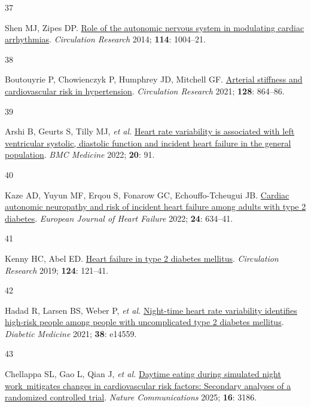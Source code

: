 \documentclass[
  a4paper,
  headsepline=true,
  open=any]{scrbook}
\newlength{\cslhangindent}
\newlength{\csllabelwidth}
\newlength{\cslentryspacingunit} %
\newenvironment{CSLReferences}[2] %
 {%
  \setlength{\parindent}{0pt}
  \ifodd #1
  \let\oldpar\par
  \def\par{\hangindent=\cslhangindent\oldpar}
  \fi
  \setlength{\parskip}{#2\cslentryspacingunit}
 }%
 {}
\newcommand{\CSLLeftMargin}[1]{\parbox[t]{\csllabelwidth}{#1}}
\newcommand{\CSLRightInline}[1]{\parbox[t]{\linewidth - \csllabelwidth}{#1}\break}
\begin{document}
\begin{CSLReferences}{0}{0}
\leavevmode{}%
\CSLLeftMargin{37 }%
\CSLRightInline{Shen MJ, Zipes DP.
\href{https://doi.org/10.1161/CIRCRESAHA.113.302549}{Role of the
autonomic nervous system in modulating cardiac arrhythmias}.
\emph{Circulation Research} 2014; \textbf{114}: 1004--21.}

\leavevmode{}%
\CSLLeftMargin{38 }%
\CSLRightInline{Boutouyrie P, Chowienczyk P, Humphrey JD, Mitchell GF.
\href{https://doi.org/10.1161/CIRCRESAHA.121.318061}{Arterial stiffness
and cardiovascular risk in hypertension}. \emph{Circulation Research}
2021; \textbf{128}: 864--86.}

\leavevmode{}%
\CSLLeftMargin{39 }%
\CSLRightInline{Arshi B, Geurts S, Tilly MJ, \emph{et al.}
\href{https://doi.org/10.1186/s12916-022-02273-9}{Heart rate variability
is associated with left ventricular systolic, diastolic function and
incident heart failure in the general population}. \emph{BMC Medicine}
2022; \textbf{20}: 91.}

\leavevmode{}%
\CSLLeftMargin{40 }%
\CSLRightInline{Kaze AD, Yuyun MF, Erqou S, Fonarow GC,
Echouffo-Tcheugui JB. \href{https://doi.org/10.1002/ejhf.2432}{Cardiac
autonomic neuropathy and risk of incident heart failure among adults
with type 2 diabetes}. \emph{European Journal of Heart Failure} 2022;
\textbf{24}: 634--41.}

\leavevmode{}%
\CSLLeftMargin{41 }%
\CSLRightInline{Kenny HC, Abel ED.
\href{https://doi.org/10.1161/CIRCRESAHA.118.311371}{Heart failure in
type 2 diabetes mellitus}. \emph{Circulation Research} 2019;
\textbf{124}: 121--41.}

\leavevmode{}%
\CSLLeftMargin{42 }%
\CSLRightInline{Hadad R, Larsen BS, Weber P, \emph{et al.}
\href{https://doi.org/10.1111/dme.14559}{Night-time heart rate
variability identifies high-risk people among people with uncomplicated
type 2 diabetes mellitus}. \emph{Diabetic Medicine} 2021; \textbf{38}:
e14559.}

\leavevmode{}%
\CSLLeftMargin{43 }%
\CSLRightInline{Chellappa SL, Gao L, Qian J, \emph{et al.}
\href{https://doi.org/10.1038/s41467-025-57846-y}{Daytime eating during
simulated night work~mitigates changes in cardiovascular risk factors:
Secondary analyses of a randomized controlled trial}. \emph{Nature
Communications} 2025; \textbf{16}: 3186.}


\end{CSLReferences}
\end{document}
